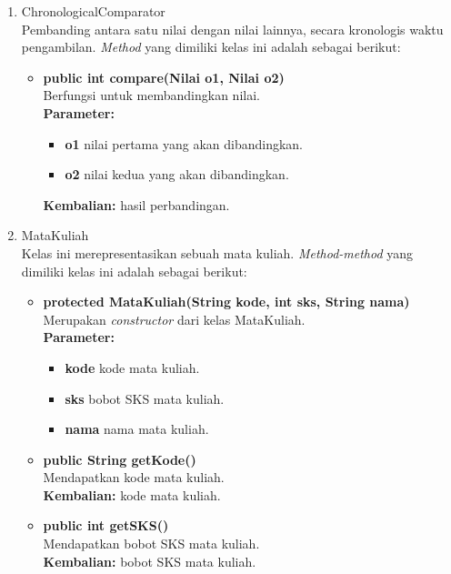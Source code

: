 \documentclass[a4paper,twoside]{article}
\begin{document}
\begin{enumerate}
\begin{enumerate}
\begin{enumerate}
\begin{enumerate}
		\item ChronologicalComparator\\
		Pembanding antara satu nilai dengan nilai lainnya, secara kronologis waktu pengambilan. \textit{Method} yang dimiliki kelas ini adalah sebagai berikut:
		
		\begin{itemize}
			\item \textbf{public int compare(Nilai o1, Nilai o2) } \\
			Berfungsi untuk membandingkan nilai. \\
			\textbf{Parameter:}
			\begin{itemize}
				\item \textbf{o1} nilai pertama yang akan dibandingkan.
				\item \textbf{o2} nilai kedua yang akan dibandingkan.
			\end{itemize}
			\textbf{Kembalian:} hasil perbandingan.
		\end{itemize}
		
		\item MataKuliah\\
		Kelas ini merepresentasikan sebuah mata kuliah. \textit{Method-method} yang dimiliki kelas ini adalah sebagai berikut:
		\begin{itemize}
			\item \textbf{protected MataKuliah(String kode, int sks, String nama)} \\
			Merupakan \textit{constructor} dari kelas MataKuliah.\\
			\textbf{Parameter:}
			\begin{itemize}
				\item \textbf{kode} kode mata kuliah.
				\item \textbf{sks} bobot SKS mata kuliah.
				\item \textbf{nama} nama mata kuliah.
			\end{itemize}
			
			\item \textbf{public String getKode()}\\
				Mendapatkan kode mata kuliah.\\
				\textbf{Kembalian:} kode mata kuliah.
				
			\item \textbf{public int getSKS()}\\
				Mendapatkan bobot SKS mata kuliah.\\
				\textbf{Kembalian:} bobot SKS mata kuliah.
				

\end{itemize}
\end{enumerate}
\end{enumerate}
\end{enumerate}
\end{enumerate}
\end{document}
